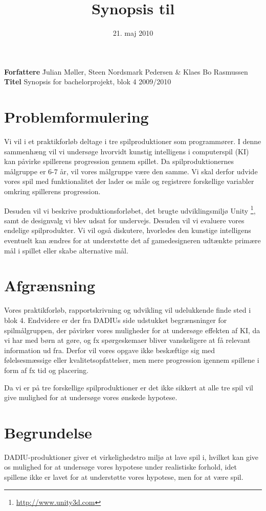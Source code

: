\documentclass[10pt,a4paper,danish]{article}
\title{Synopsis til \thetitle}
\date{21. maj 2010}
\author{\theauthors}
\newcommand{\thetitle}{Synopsis for bachelorprojekt, blok 4 2009/2010}
\newcommand{\theauthors}{Julian Møller, Steen Nordsmark Pedersen \& Klaes Bo Rasmussen}
\begin{document}
\begin{tabbing}
\textbf{Forfattere} \= \theauthors \\
\textbf{Titel} \> \thetitle
\end{tabbing}

\section{Problemformulering}
\label{sec:Problemformulering}
Vi vil i et praktikforløb deltage i tre spilproduktioner som programmører. I
denne sammenhæng vil vi undersøge hvorvidt kunstig intelligens i computerspil
(KI) kan påvirke spillerens progression gennem spillet. Da spilproduktionernes
målgruppe er 6-7 år, vil vores målgruppe være den samme. Vi skal derfor udvide
vores spil med funktionalitet der lader os måle og registrere forskellige
variabler omkring spillerens progression.

Desuden vil vi beskrive produktionsforløbet, det brugte udviklingsmiljø Unity
\footnote{\url{http://www.unity3d.com}}, samt de designvalg vi blev udsat for
undervejs. Desuden vil vi evaluere vores endelige spilprodukter. Vi vil også
diskutere, hvorledes den kunstige intelligens eventuelt kan ændres for at
understøtte det af gamedesigneren udtænkte primære mål i spillet eller skabe
alternative mål.

\section{Afgrænsning}
\label{sec:Afgraensning}
Vores praktikforløb, rapportskrivning og udvikling vil udelukkende finde sted
i blok 4. Endvidere er der fra DADIUs side udstukket begrænsninger for
spilmålgruppen, der påvirker vores muligheder for at undersøge effekten af KI,
da vi har med børn at gøre, og fx spørgeskemaer bliver vanskeligere at få
relevant information ud fra. Derfor vil vores opgave ikke beskæftige sig med
følelsesmæssige eller kvalitetsopfattelser, men mere progression igennem
spillene i form af fx tid og placering.

Da vi er på tre forskellige spilproduktioner er det ikke sikkert at alle tre
spil vil give mulighed for at undersøge vores ønskede hypotese.

\section{Begrundelse}
\label{sec:Begrundelse}
DADIU-produktioner giver et virkelighedstro miljø at lave spil i, hvilket kan
give os mulighed for at undersøge vores hypotese under realistiske forhold,
idet spillene ikke er lavet for at understøtte vores hypotese, men for at være
spil.
\end{document}
